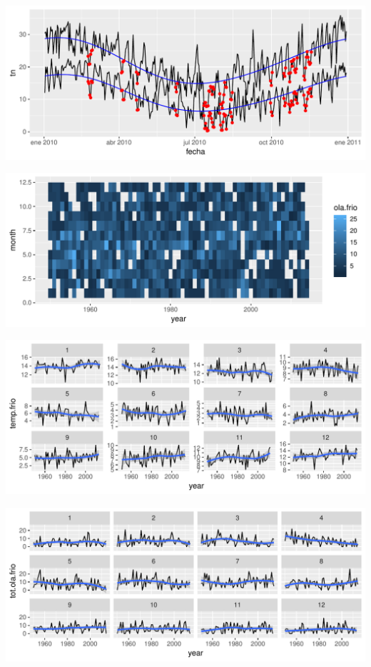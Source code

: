 \documentclass[12pt]{article}\usepackage[]{graphicx}\usepackage[]{color}
\makeatletter
\def\maxwidth{ %
  \ifdim\Gin@nat@width>\linewidth
    \linewidth
  \else
    \Gin@nat@width
  \fi
}
\newenvironment{knitrout}{}{} %
\makeatother
\begin{document}
\begin{knitrout}
\color{fgcolor}

{\centering \includegraphics[width=\maxwidth]{figure/popurri-1} 

}




{\centering \includegraphics[width=\maxwidth]{figure/popurri-2} 

}




{\centering \includegraphics[width=\maxwidth]{figure/popurri-3} 

}




{\centering \includegraphics[width=\maxwidth]{figure/popurri-4} 

}
\end{knitrout}
\end{document}
